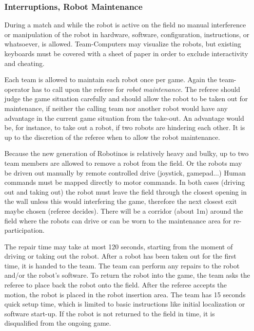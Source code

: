 \documentclass[12pt,twoside]{article}
\begin{document}
\subsubsection{Interruptions, Robot Maintenance }
\label{sec:robot-maintenance}
During a match and while the robot is active on the field no manual
interference or manipulation of the robot in hardware, software,
configuration, instructions, or whatsoever, is allowed.
Team-Computers may visualize the robots, but existing keyboards must be 
covered with a sheet of paper in order to exclude interactivity and cheating.


Each team is allowed to maintain each robot once per game. Again the 
team-operator has to call upon the referee for \textit{robot maintenance}. 
The referee should judge the game situation carefully and should allow the
robot to be taken out for maintenance, if neither the calling team
nor another robot would have any advantage in the current game
situation from the take-out. An advantage would be, for instance, to
take out a robot, if two robots are hindering each other. It is up to
the discretion of the referee when to allow the robot maintenance.

Because the new generation of Robotinos is relatively heavy and bulky, 
up to two team members are allowed to remove a robot from the field. 
Or the robots may be driven out manually by remote controlled drive
(joystick, gamepad...)
Human commands must be mapped directly to motor commands. 
In both cases (driving out and taking out) the robot must leave the field through
the closest opening in the wall unless this would interfering the game, therefore the 
next closest exit maybe chosen (referee decides).
There will be a corridor (about 1m) around the field where the robots can drive 
or can be worn 
to the maintenance area for re-participation.

The repair time may take at most 120 seconds, starting from the moment of
driving or taking out the robot. 
After a robot has been taken out for the first time, it is handed to
the team. The team can perform any repairs to the robot and/or the
robot's software. %
 To return the robot into the game, the team asks the referee to place
back the robot onto the field. After the referee accepts the motion,
the robot is placed in the robot insertion area. The team has 15
seconds quick setup time, which is limited to basic instructions like
initial localization or software start-up.
If the robot is not returned to the field in time, it is disqualified from 
the ongoing game.
\end{document}
